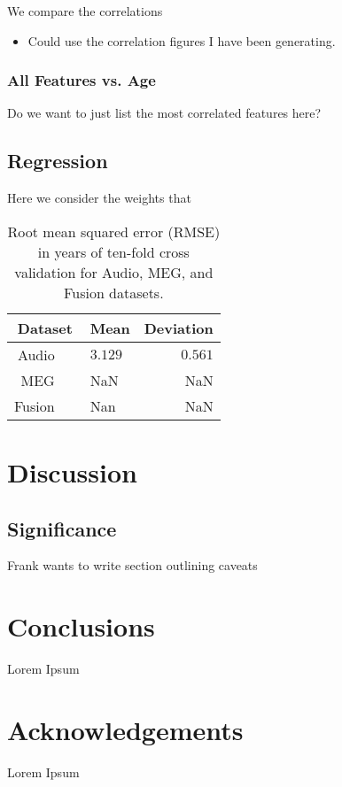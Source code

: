 \documentclass[a4paper]{article}
\begin{document}
We compare the correlations 

\begin{itemize}
\item Could use the correlation figures I have been generating.
\end{itemize}


\subsubsection{All Features vs. Age}

Do we want to just list the most correlated features here?

\subsection{Regression}

Here we consider the weights that 

\begin{table}[t]
  \caption{Root mean squared error (RMSE) in years of ten-fold cross validation for Audio, MEG, and Fusion datasets.}
  \label{tab:xvalreg}
  \centering
  \begin{tabular}{ r@{}l  r }
    \toprule
    \multicolumn{1}{c}{\textbf{Dataset}} & \multicolumn{1}{c}{\textbf{Mean}} & \multicolumn{1}{c}{\textbf{Deviation}} \\
    \midrule
    Audio~~~                        & $3.129$           &     $0.561$      \\
    MEG~~~                          & NaN             &      NaN      \\
    Fusion~~~                       & Nan             &      NaN      \\
    \bottomrule
  \end{tabular}
\end{table}

\section{Discussion}

\subsection{Significance}

Frank wants to write section outlining caveats

\section{Conclusions}

Lorem Ipsum

\section{Acknowledgements}

Lorem Ipsum





\end{document}
